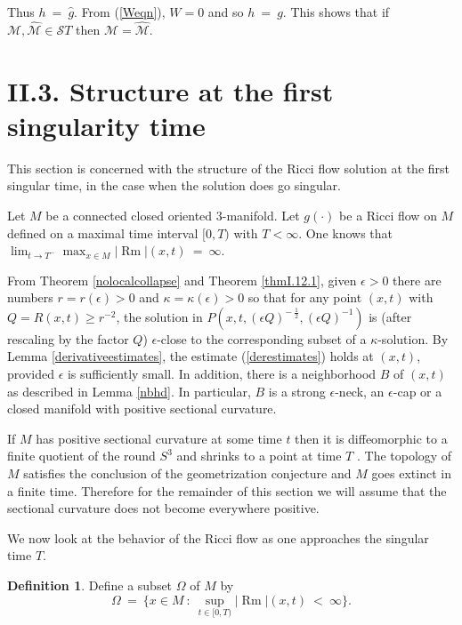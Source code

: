 \documentclass[12pt]{amsart}
\newcommand{\M}{{\mathcal M}}
\newcommand{\Rm}{\operatorname{Rm}}
\numberwithin{equation}{section}
\theoremstyle{plain}
\theoremstyle{definition}
\newtheorem{definition}[equation]{Definition}
\theoremstyle{remark}
\begin{document}
Thus $h \: = \: \widehat{g}$. From (\ref{Weqn}), $W = 0$ and so
$h \: = \: g$. This shows that if $\M, \widehat{\M} \in
{\mathcal ST}$ then $\M = \widehat{\M}$.

\section{II.3. Structure at the first singularity time} \label{II.3}

This section is concerned with the structure of the Ricci flow solution at the
first singular time, in the case when the solution does go singular.

Let $M$ be a connected closed oriented $3$-manifold.  Let $g(\cdot)$ be a Ricci flow on
$M$ defined on a maximal time interval $[0,T)$ with $T < \infty$. One knows
that $\lim_{t \rightarrow T^-} \max_{x \in M} |\Rm|(x,t) \: = \: \infty$.

From Theorem \ref{nolocalcollapse} and Theorem \ref{thmI.12.1}, given
$\epsilon > 0$ there are numbers $r = r(\epsilon) > 0$ and
$\kappa = \kappa(\epsilon) > 0$ so that for any
point $(x,t)$ with $Q = R(x,t)  \ge r^{-2}$, the solution in 
$P(x,t, (\epsilon Q)^{- \: \frac12}, (\epsilon Q)^{- 1})$ is (after rescaling
by the factor $Q$) $\epsilon$-close
to the corresponding subset of a $\kappa$-solution. By Lemma
\ref{derivativeestimates}, the estimate (\ref{derestimates})
holds at $(x,t)$,
provided $\epsilon$ is sufficiently small. In addition, 
there is a neighborhood $B$ of $(x,t)$ 
as described in Lemma  \ref{nbhd}.  In particular, $B$ is a strong $\epsilon$-neck,
an $\epsilon$-cap or a closed manifold with positive sectional curvature.

If $M$ has positive sectional curvature at some time $t$ then it
is diffeomorphic
to a finite quotient of the round $S^3$ and shrinks to a point at time
$T$ \cite{Hamiltonnnnn}. 
The topology of $M$ satisfies the conclusion of the geometrization
conjecture and $M$ goes extinct in a finite time. Therefore
for the remainder of this section we will assume that the sectional curvature
does not become everywhere positive.

We now look at the behavior of the Ricci flow as one approaches the
singular time $T$. 

\begin{definition}
Define a subset $\Omega$ of $M$ by
\begin{equation}
\Omega \: = \: \{x \in M \: : \: \sup_{t \in [0,T)} |\Rm|(x,t) \: < \: \infty \}.
\end{equation}
\end{definition}
\end{document}
